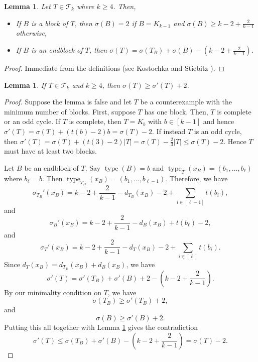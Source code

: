 \documentclass[12pt]{article}
\theoremstyle{plain}
\newtheorem{lem}[thm]{Lemma}
\theoremstyle{definition}
\theoremstyle{remark}
\newcommand{\fancy}[1]{\mathcal{#1}}
\newcommand{\T}{\fancy{T}}
\newcommand{\irange}[1]{\left[#1\right]}
\newcommand{\parens}[1]{\left( #1 \right)}
\newcommand{\type}{\operatorname{type}}
\begin{document}
\begin{lem}\label{EndBlockBusiness}
	Let $T \in \T_k$ where $k \ge 4$.  Then,
	\begin{itemize}
		\item[(a)] If $B$ is a block of $T$, then $\sigma(B) = 2$ if $B = K_{k-1}$ and $\sigma(B) \ge k - 2 + \frac{2}{k-1}$ otherwise,
		\item[(b)] If $B$ is an endblock of $T$, then $\sigma(T) = \sigma(T_B) + \sigma(B) - \parens{ k - 2 + \frac{2}{k-1}}$.
	\end{itemize}
\end{lem}
\begin{proof}
	Immediate from the definitions (see Kostochka and Stiebitz \cite{kostochkastiebitzedgesincriticalgraph}).
\end{proof}

\begin{lem}\label{SigmaPrimeIsTwoLess}
	If $T \in \T_k$ and $k \ge 4$, then  $\sigma(T) \ge \sigma'(T) + 2$.
\end{lem}
\begin{proof}
	Suppose the lemma is false and let $T$ be a counterexample with the minimum number of blocks.  First, suppose $T$ has one block.  Then, $T$ is complete or an odd cycle.  If $T$ is complete, then $T = K_b$ with $b \in \irange{k-1}$ and hence $\sigma'(T) = \sigma(T) + (t(b) - 2)b = \sigma(T) - 2$.  If instead $T$ is an odd cycle, then $\sigma'(T) = \sigma(T) + (t(3) - 2)|T| = \sigma(T) - \frac23|T| \le \sigma(T) - 2$.  Hence $T$ must have at least two blocks.
	
	Let $B$ be an endblock of $T$.  Say $\type(B) = b$ and $\type_T(x_B) = (b_1, \ldots, b_\ell)$ where $b_\ell = b$.  Then $\type_{T_B}(x_B) = (b_1, \ldots, b_{\ell - 1})$.  Therefore, we have
	\[\sigma_{T_B}'(x_B) = k - 2 + \frac{2}{k-1} - d_{T_B}(x_B) - 2 + \sum_{i \in \irange{\ell - 1}}t(b_i),\] and
	\[\sigma_{B}'(x_B) = k - 2 + \frac{2}{k-1} - d_{B}(x_B) + t(b_\ell) - 2,\] and
	\[\sigma_T'(x_B) = k - 2 + \frac{2}{k-1} - d_{T}(x_B) - 2 + \sum_{i \in \irange{\ell}}t(b_i).\]
	Since $d_T(x_B) = d_{T_B}(x_B) + d_B(x_B)$, we have
	\[\sigma'(T) = \sigma'(T_B) + \sigma'(B) + 2 - \parens{k - 2 + \frac{2}{k-1}}.\]
	By our minimality condition on $T$, we have
	\[\sigma(T_B) \ge \sigma'(T_B) + 2,\] and
	\[\sigma(B) \ge \sigma'(B) + 2.\]
	Putting this all together with Lemma \ref{EndBlockBusiness} gives the contradiction
	\[\sigma'(T) \le \sigma(T_B) + \sigma'(B) - \parens{k - 2 + \frac{2}{k-1}} = \sigma(T) - 2.\]
\end{proof}
\end{document}
